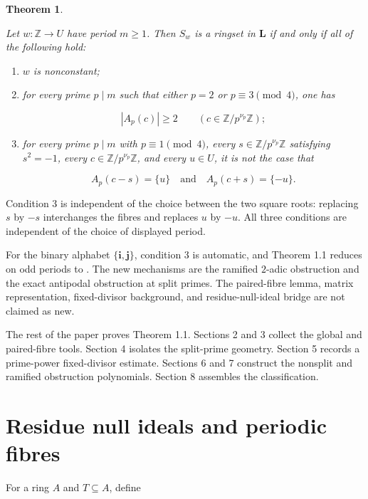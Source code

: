\documentclass[11pt]{article}
\newtheorem{theorem}{Theorem}[section]
\numberwithin{equation}{section}
\begin{document}
\begin{theorem}
\label{thm:main}

Let $w:\mathbb Z\to U$ have period $m\ge1$. Then $S_w$ is a ringset in
$\mathbf L$ if and only if all of the following hold:

\begin{enumerate}
\item $w$ is nonconstant;
\item for every prime $p\mid m$ such that either $p=2$ or
$p\equiv3\pmod4$, one has

$$
|A_p(c)|\ge2
\qquad
\left(c\in\mathbb Z/p^{\nu_p}\mathbb Z\right);
$$

\item for every prime $p\mid m$ with $p\equiv1\pmod4$, every
$s\in\mathbb Z/p^{\nu_p}\mathbb Z$ satisfying $s^2=-1$, every
$c\in\mathbb Z/p^{\nu_p}\mathbb Z$, and every $u\in U$, it is not the
case that

$$
A_p(c-s)=\{u\}
\quad\text{and}\quad
A_p(c+s)=\{-u\}.
$$

\end{enumerate}

\end{theorem}

Condition 3 is independent of the choice between the two square roots:
replacing $s$ by $-s$ interchanges the fibres and replaces $u$ by $-u$.
All three conditions are independent of the choice of displayed period.

For the binary alphabet $\{\mathbf i,\mathbf j\}$, condition 3 is automatic,
and Theorem 1.1 reduces on odd periods to \cite[Theorem 1.1]{carptopus-odd}. The new mechanisms
are the ramified $2$-adic obstruction and the exact antipodal obstruction at
split primes. The paired-fibre lemma, matrix representation, fixed-divisor
background, and residue-null-ideal bridge are not claimed as new.

The rest of the paper proves Theorem 1.1. Sections 2 and 3 collect the global
and paired-fibre tools. Section 4 isolates the split-prime geometry. Section
5 records a prime-power fixed-divisor estimate. Sections 6 and 7 construct
the nonsplit and ramified obstruction polynomials. Section 8 assembles the
classification.

\section{Residue null ideals and periodic fibres}


For a ring $A$ and $T\subseteq A$, define
\end{document}
